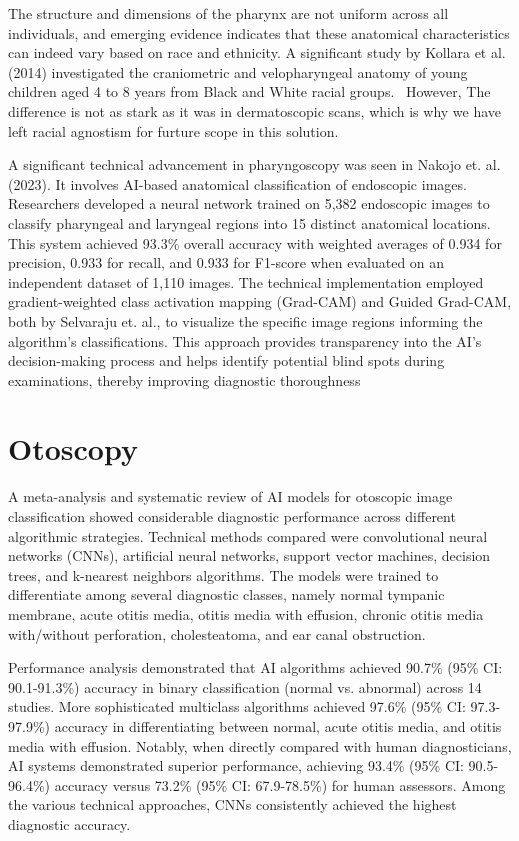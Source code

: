 The structure and dimensions of the pharynx are not uniform across all individuals, and emerging evidence indicates that these anatomical characteristics can indeed vary based on race and ethnicity. A significant study by Kollara et al. (2014) investigated the craniometric and velopharyngeal anatomy of young children aged 4 to 8 years from Black and White racial groups.~\cite{kollara} However, The difference is not as stark as it was in dermatoscopic scans, which is why we have left racial agnostism for furture scope in this solution.

A significant technical advancement in pharyngoscopy was seen in Nakojo et. al. (2023). It involves AI-based anatomical classification of endoscopic images. Researchers developed a neural network trained on 5,382 endoscopic images to classify pharyngeal and laryngeal regions into 15 distinct anatomical locations. This system achieved 93.3\% overall accuracy with weighted averages of 0.934 for precision, 0.933 for recall, and 0.933 for F1-score when evaluated on an independent dataset of 1,110 images. The technical implementation employed gradient-weighted class activation mapping (Grad-CAM) \cite{selva} and Guided Grad-CAM, both by Selvaraju et. al., to visualize the specific image regions informing the algorithm's classifications. This approach provides transparency into the AI's decision-making process and helps identify potential blind spots during examinations, thereby improving diagnostic thoroughness~\cite{nakajo} \par

\section{Otoscopy}

A meta-analysis and systematic review of AI models for otoscopic image classification showed considerable diagnostic performance across different algorithmic strategies. Technical methods compared were convolutional neural networks (CNNs), artificial neural networks, support vector machines, decision trees, and k-nearest neighbors algorithms. The models were trained to differentiate among several diagnostic classes, namely normal tympanic membrane, acute otitis media, otitis media with effusion, chronic otitis media with/without perforation, cholesteatoma, and ear canal obstruction.~\cite{habibi}

Performance analysis demonstrated that AI algorithms achieved 90.7\% (95\% CI: 90.1-91.3\%) accuracy in binary classification (normal vs. abnormal) across 14 studies. More sophisticated multiclass algorithms achieved 97.6\% (95\% CI: 97.3-97.9\%) accuracy in differentiating between normal, acute otitis media, and otitis media with effusion. Notably, when directly compared with human diagnosticians, AI systems demonstrated superior performance, achieving 93.4\% (95\% CI: 90.5-96.4\%) accuracy versus 73.2\% (95\% CI: 67.9-78.5\%) for human assessors. Among the various technical approaches, CNNs consistently achieved the highest diagnostic accuracy. \cite{habibi}